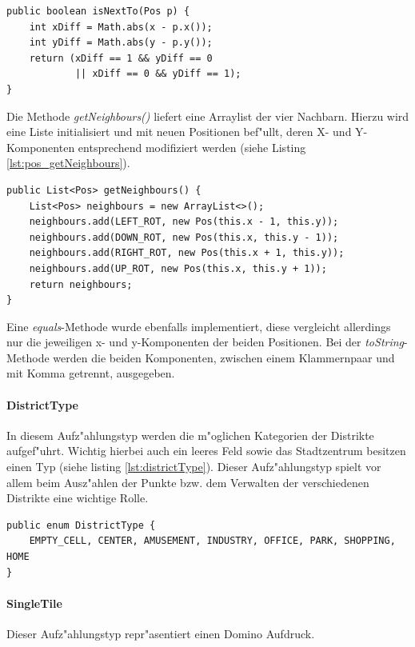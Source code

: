 \begin{lstlisting}[float,style=CodeHighlighting,caption=Pos - isNextTo(),label=lst:pos_isNextTo]
public boolean isNextTo(Pos p) {
    int xDiff = Math.abs(x - p.x());
	int yDiff = Math.abs(y - p.y());
	return (xDiff == 1 && yDiff == 0
            || xDiff == 0 && yDiff == 1);
}
\end{lstlisting}

Die Methode \emph{getNeighbours()} liefert eine Arraylist der vier Nachbarn. Hierzu wird eine Liste initialisiert und mit neuen Positionen bef"ullt, deren X- und Y-Komponenten entsprechend modifiziert werden (siehe Listing \ref{lst:pos_getNeighbours}). 

\begin{lstlisting}[float,style=CodeHighlighting,caption=Pos - getNeighbours(),label=lst:pos_getNeighbours]
public List<Pos> getNeighbours() {
    List<Pos> neighbours = new ArrayList<>();
    neighbours.add(LEFT_ROT, new Pos(this.x - 1, this.y));
    neighbours.add(DOWN_ROT, new Pos(this.x, this.y - 1));
    neighbours.add(RIGHT_ROT, new Pos(this.x + 1, this.y));
    neighbours.add(UP_ROT, new Pos(this.x, this.y + 1));
    return neighbours;
}
\end{lstlisting}

Eine \emph{equals}-Methode wurde ebenfalls implementiert, diese vergleicht allerdings nur die jeweiligen x- und y-Komponenten der beiden Positionen. Bei der \emph{toString}-Methode werden die beiden Komponenten, zwischen einem Klammernpaar und mit Komma getrennt, ausgegeben. 

\paragraph{DistrictType}
\label{par:districtType}
In diesem Aufz"ahlungstyp werden die m"oglichen Kategorien der Distrikte aufgef"uhrt. Wichtig hierbei auch ein leeres Feld sowie das Stadtzentrum besitzen einen Typ (siehe listing \ref{lst:districtType}). 
Dieser Aufz"ahlungstyp spielt vor allem beim Ausz"ahlen der Punkte bzw. dem Verwalten der verschiedenen Distrikte eine wichtige Rolle. 
\begin{lstlisting}[float,style=CodeHighlighting,caption=DistrictType,label=lst:districtType]
public enum DistrictType {
    EMPTY_CELL, CENTER, AMUSEMENT, INDUSTRY, OFFICE, PARK, SHOPPING, HOME
}
\end{lstlisting}

\paragraph{SingleTile}
\label{par:singleTile}
Dieser Aufz"ahlungstyp repr"asentiert einen Domino Aufdruck. 

